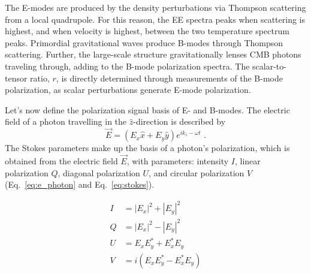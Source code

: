 The E-modes are produced by the density perturbations via Thompson scattering from a local quadrupole.  For this reason, the EE spectra peaks when scattering is highest, and when velocity is highest, between the two temperature spectrum peaks.  Primordial gravitational waves produce B-modes through Thompson scattering.  Further, the large-scale structure gravitationally lenses CMB photons traveling through, adding to the B-mode polarization spectra.  The scalar-to-tensor ratio, $r$, is directly determined through measurements of the B-mode polarization, as scalar perturbations generate E-mode polarization.

Let's now define the polarization signal basis of E- and B-modes.  The electric field of a photon travelling in the $\hat{z}$-direction is described by
\begin{equation}
    \Vec{E} = (E_x\hat{x} + E_y\hat{y})e^{i k_z - \omega t } \text{ .}
    \label{eq:e_photon}
\end{equation}
The Stokes parameters make up the basis of a photon's polarization, which is obtained from the electric field $\Vec{E}$, with parameters: intensity $I$, linear polarization $Q$, diagonal polarization $U$, and circular polarization $V$ (Eq.~\ref{eq:e_photon} and Eq.~\ref{eq:stokes}).

\begin{equation}
\begin{split}
    I & = |E_x|^2 + |E_y|^2 \\
    Q & = |E_x|^2 - |E_y|^2 \\
    U & = E_x E_y^* + E_x^*E_y\\
    V & = i(E_x E_y^* - E_x^*E_y) \\
\end{split}
\label{eq:stokes}
\end{equation}

